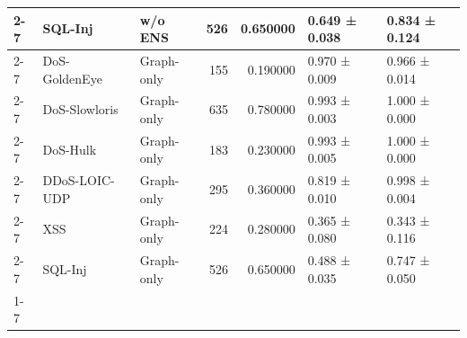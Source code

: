 \begin{table}
\begin{tabular}{lllrrll}
\cline{2-7}
 & SQL-Inj & w/o ENS & 526 & 0.650000 & 0.649 ± 0.038 & 0.834 ± 0.124 \\
\cline{2-7}
 & DoS-GoldenEye & Graph-only & 155 & 0.190000 & 0.970 ± 0.009 & 0.966 ± 0.014 \\
\cline{2-7}
 & DoS-Slowloris & Graph-only & 635 & 0.780000 & 0.993 ± 0.003 & 1.000 ± 0.000 \\
\cline{2-7}
 & DoS-Hulk & Graph-only & 183 & 0.230000 & 0.993 ± 0.005 & 1.000 ± 0.000 \\
\cline{2-7}
 & DDoS-LOIC-UDP & Graph-only & 295 & 0.360000 & 0.819 ± 0.010 & 0.998 ± 0.004 \\
\cline{2-7}
 & XSS & Graph-only & 224 & 0.280000 & 0.365 ± 0.080 & 0.343 ± 0.116 \\
\cline{2-7}
 & SQL-Inj & Graph-only & 526 & 0.650000 & 0.488 ± 0.035 & 0.747 ± 0.050 \\
\cline{1-7} \cline{2-7}
\bottomrule
\end{tabular}
\end{table}
